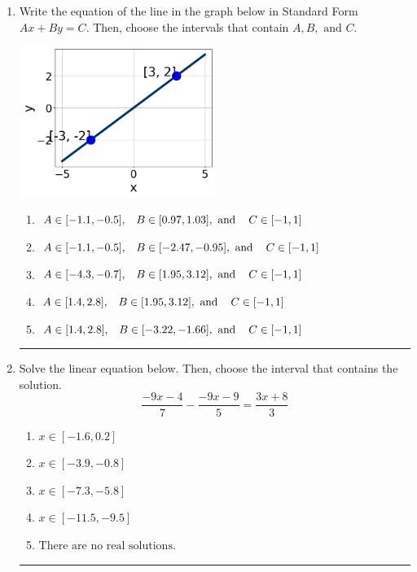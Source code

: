 \documentclass[14pt]{extbook}
\newcommand{\litem}[1]{\item#1\hspace*{-1cm}\rule{\textwidth}{0.4pt}}
\begin{document}
\begin{enumerate}
{\begin{enumerate}[label=\Alph*.]
\end{enumerate} }
\litem{
Write the equation of the line in the graph below in Standard Form $Ax+By=C$. Then, choose the intervals that contain $A, B, \text{ and } C$.
\begin{center}
    \includegraphics[width=0.5\textwidth]{../Figures/linearGraphToStandardCopyB.png}
\end{center}
\begin{enumerate}[label=\Alph*.]
\item \( A \in [-1.1, -0.5], \hspace{3mm} B \in [0.97, 1.03], \text{ and } \hspace{3mm} C \in [-1, 1] \)
\item \( A \in [-1.1, -0.5], \hspace{3mm} B \in [-2.47, -0.95], \text{ and } \hspace{3mm} C \in [-1, 1] \)
\item \( A \in [-4.3, -0.7], \hspace{3mm} B \in [1.95, 3.12], \text{ and } \hspace{3mm} C \in [-1, 1] \)
\item \( A \in [1.4, 2.8], \hspace{3mm} B \in [1.95, 3.12], \text{ and } \hspace{3mm} C \in [-1, 1] \)
\item \( A \in [1.4, 2.8], \hspace{3mm} B \in [-3.22, -1.66], \text{ and } \hspace{3mm} C \in [-1, 1] \)

\end{enumerate} }
\litem{
Solve the linear equation below. Then, choose the interval that contains the solution.\[ \frac{-9x -4}{7} - \frac{-9x -9}{5} = \frac{3x + 8}{3} \]\begin{enumerate}[label=\Alph*.]
\item \( x \in [-1.6, 0.2] \)
\item \( x \in [-3.9, -0.8] \)
\item \( x \in [-7.3, -5.8] \)
\item \( x \in [-11.5, -9.5] \)
\item \( \text{There are no real solutions.} \)


\end{enumerate}}
\end{enumerate}
\end{document}
